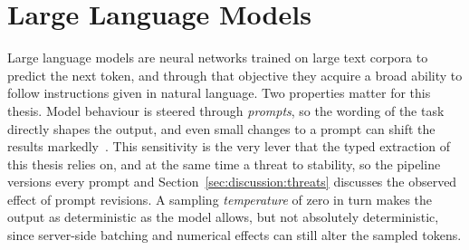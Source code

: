 \section{Large Language Models}
\label{sec:foundations:llm}

Large language models are neural networks trained on large text corpora to
predict the next token, and through that objective they acquire a broad ability
to follow instructions given in natural language. Two properties matter for
this thesis. Model behaviour is steered through \emph{prompts}, so the
wording of the task directly shapes the output, and even small changes to a
prompt can shift the results markedly~\cite{sclar2024}. This sensitivity is the very
lever that the typed extraction of this thesis relies on, and at the same time
a threat to stability, so the pipeline versions every prompt and
Section~\ref{sec:discussion:threats} discusses the observed effect of prompt
revisions. A sampling \emph{temperature} of zero in turn makes the output as
deterministic as the model allows, but not absolutely deterministic, since
server-side batching and numerical effects can still alter the sampled tokens.
